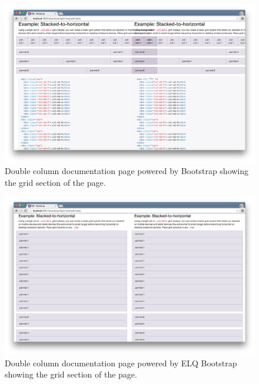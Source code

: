 \documentclass[a4paper,11pt]{kth-mag}
\begin{document}
        \begin{figure}[htbp!]
          \centering
          \includegraphics[width=0.9\linewidth]{images/bootstrap-mq-grid}
          \caption{Double column documentation page powered by \gls{Bootstrap} showing the grid section of the page.}
          \label{fig:appendix-bootstrap-mq-grid-small}
        \end{figure}
        \begin{figure}[htbp!]
          \centering
          \includegraphics[width=0.9\linewidth]{images/bootstrap-eq-grid}
          \caption{Double column documentation page powered by \gls{ELQ} \gls{Bootstrap} showing the grid section of the page.}
          \label{fig:appendix-bootstrap-eq-grid-small}
        \end{figure}

        \FloatBarrier
\end{document}

